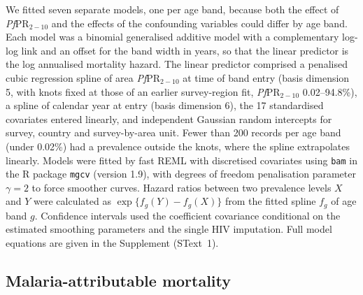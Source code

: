 \documentclass[12pt]{article}
\begin{document}
We fitted seven separate models, one per age band, because both the effect of \textit{Pf}PR$_{2-10}$ and the effects of the confounding variables could differ by age band. Each model was a binomial generalised additive model with a complementary log-log link and an offset for the band width in years, so that the linear predictor is the log annualised mortality hazard. The linear predictor comprised a penalised cubic regression spline of area \textit{Pf}PR$_{2-10}$ at time of band entry (basis dimension 5, with knots fixed at those of an earlier survey-region fit, \textit{Pf}PR$_{2-10}$ 0.02–94.8\%), a spline of calendar year at entry (basis dimension 6), the 17 standardised covariates entered linearly, and independent Gaussian random intercepts for survey, country and survey-by-area unit. Fewer than 200 records per age band (under 0.02\%) had a prevalence outside the knots, where the spline extrapolates linearly. Models were fitted by fast REML with discretised covariates using \texttt{bam} in the R package \texttt{mgcv} (version 1.9), with degrees of freedom penalisation parameter $\gamma = 2$ to force smoother curves. Hazard ratios between two prevalence levels $X$ and $Y$ were calculated as $\exp\{f_g(Y) - f_g(X)\}$ from the fitted spline $f_g$ of age band $g$. Confidence intervals used the coefficient covariance conditional on the estimated smoothing parameters and the single HIV imputation. Full model equations are given in the Supplement (SText~1).

\subsection*{Malaria-attributable mortality}
\end{document}
